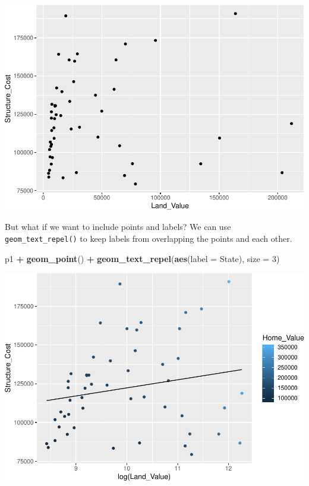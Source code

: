 \documentclass[
]{book}
\newenvironment{Shaded}{\begin{snugshade}}{\end{snugshade}}
\newcommand{\DataTypeTok}[1]{\textcolor[rgb]{0.13,0.29,0.53}{#1}}
\newcommand{\DecValTok}[1]{\textcolor[rgb]{0.00,0.00,0.81}{#1}}
\newcommand{\KeywordTok}[1]{\textcolor[rgb]{0.13,0.29,0.53}{\textbf{#1}}}
\newcommand{\NormalTok}[1]{#1}
\newcommand{\OperatorTok}[1]{\textcolor[rgb]{0.81,0.36,0.00}{\textbf{#1}}}
\newcommand{\StringTok}[1]{\textcolor[rgb]{0.31,0.60,0.02}{#1}}
\begin{document}
\includegraphics{R/Rgraphics/figures/unnamed-chunk-147-1.pdf}

But what if we want to include points and labels? We can use \texttt{geom\_text\_repel()} to keep labels from overlapping the points and each other.

\begin{Shaded}
\begin{Highlighting}[]
\NormalTok{p1 }\OperatorTok{+}\StringTok{ }
\StringTok{  }\KeywordTok{geom\_point}\NormalTok{() }\OperatorTok{+}\StringTok{ }
\StringTok{  }\KeywordTok{geom\_text\_repel}\NormalTok{(}\KeywordTok{aes}\NormalTok{(}\DataTypeTok{label =}\NormalTok{ State), }\DataTypeTok{size =} \DecValTok{3}\NormalTok{)}
\end{Highlighting}
\end{Shaded}

\includegraphics{R/Rgraphics/figures/unnamed-chunk-148-1.pdf}
\end{document}
